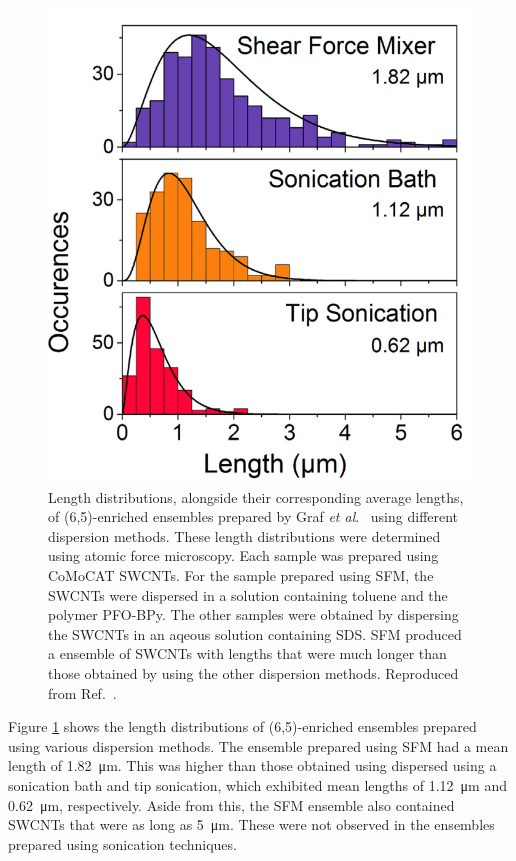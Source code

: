 \begin{figure}[H]
	\centering
	\includegraphics[scale=2]{images/chapter_methods/lengths_graf_2}
	\caption{Length distributions, alongside their corresponding average lengths, of (6,5)-enriched ensembles prepared by Graf \textit{et al}.\ \cite{graf2016large} using different dispersion methods. These length distributions were determined using atomic force microscopy. Each sample was prepared using CoMoCAT SWCNTs. For the sample prepared using SFM, the SWCNTs were dispersed in a solution containing toluene and the polymer PFO-BPy. The other samples were obtained by dispersing the SWCNTs in an aqeous solution containing SDS. SFM produced a ensemble of SWCNTs with lengths that were much longer than those obtained by using the other dispersion methods. Reproduced from Ref.\ \cite{graf2016large}.}
	\label{fig:dist_graf}
\end{figure}

Figure \ref{fig:dist_graf} shows the length distributions of (6,5)-enriched ensembles prepared using various dispersion methods. The ensemble prepared using SFM had a mean length of \SI{1.82}{\micro\meter}. This was higher than those obtained using dispersed using a sonication bath and tip sonication, which exhibited mean lengths of \SI{1.12}{\micro\meter} and \SI{0.62}{\micro\meter}, respectively. Aside from this, the SFM ensemble also contained SWCNTs that were as long as \SI{5}{\micro\meter}. These were not observed in the ensembles prepared using sonication techniques.


